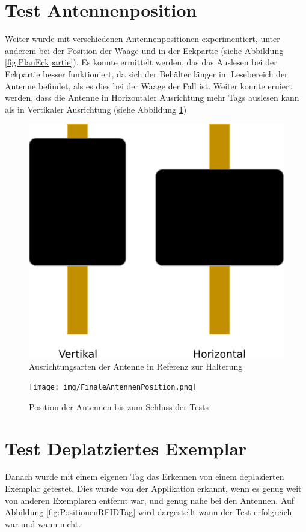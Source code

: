 \documentclass[parskip=full, a4paper]{scrartcl}
\begin{document}
\section{Test Antennenposition}
Weiter wurde mit verschiedenen Antennenpositionen experimentiert, unter anderem bei der Position der Waage und in der Eckpartie (siehe Abbildung \ref{fig:PlanEckpartie}). Es konnte ermittelt werden, das das Auslesen bei der Eckpartie besser funktioniert, da sich der Behälter länger im Lesebereich der Antenne befindet, als es dies bei der Waage der Fall ist. Weiter konnte eruiert werden, dass die Antenne in Horizontaler Ausrichtung mehr Tags auslesen kann als in Vertikaler Ausrichtung (siehe Abbildung \ref{fig:AusrichtungAntenne})

\begin{figure}[htb]
	\centering
	\includegraphics[keepaspectratio,width=0.6\linewidth]{img/AusrichtungAntenne.png}
	\caption{Ausrichtungsarten der Antenne in Referenz zur Halterung}
	\label{fig:AusrichtungAntenne}
\end{figure}

\begin{figure}[htb]
	\centering
	\texttt{[image: img/FinaleAntennenPosition.png]}
	\caption{Position der Antennen bis zum Schluss der Tests}
	\label{fig:FinalePositionAntennen}
\end{figure}

\section{Test Deplatziertes Exemplar}
Danach wurde mit einem eigenen Tag das Erkennen von einem deplazierten Exemplar getestet. Dies wurde von der Applikation erkannt, wenn es genug weit von anderen Exemplaren entfernt war, und genug nahe bei den Antennen. Auf Abbildung \ref{fig:PositionenRFIDTag} wird dargestellt wann der Test erfolgreich war und wann nicht.
\end{document}
